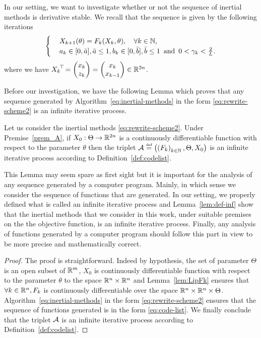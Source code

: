 In our setting, we want to investigate whether or not the sequence of inertial methods is derivative stable.   We recall that the sequence is given by the following iterations 
\begin{equation}\label{eq:rewrite-scheme2}
\begin{cases}
& X_{k+1}(\theta)=F_k(X_k,\theta),\quad \forall k\in\mathbb{N},\\
& a_{k}\in[0,\bar{a}], \bar{a}\leq1, b_{k}\in[0,\bar{b}], \bar{b}\leq1\enskip \text{and} \enskip 0<\gamma_{k}<\frac{2}{L}.
\end{cases}
\end{equation}
where we have ${X_k}^{\!\top\!}=\begin{pmatrix}x_{k}\\{z}_{k}\end{pmatrix}=\begin{pmatrix}x_{k}\\x_{k-1}\end{pmatrix}\in\mathbb{R}^{2n}$. 

Before our investigation, we have the following Lemma which proves that any sequence generated by Algorithm~\ref{eq:inertial-methods} in the form \eqref{eq:rewrite-scheme2} is an infinite iterative process.
\begin{lemma}\label{lem:def-inf} Let us consider the  inertial methods \eqref{eq:rewrite-scheme2}. Under Premise~\ref{prem_A}, if $X_0:\Theta\to\mathbb{R}^{2n}$ is a continuously differentiable function with respect to the parameter $\theta$ then the triplet $\mathcal{A}\stackrel{\text{\rm\tiny def}}{=}\left({\left(F_k\right)_{k\in\mathbb{N}},\Theta,X_0}\right)$ is an infinite  iterative process according to Definition~\ref{def:codelist}.
\end{lemma}
\begin{remark}\label{rmk:def-inf} This Lemma may seem spare as first sight but it is important for the analysis of any sequence  generated by a computer program. Mainly, in which sense we consider the sequence of functions that are generated. In our setting, we properly defined what is called an infinite iterative process and Lemma~\ref{lem:def-inf} show that  the inertial methods that we consider in this work, under suitable premises on the the objective function, is an infinite iterative process. Finally, any analysis of functions generated by a computer program should follow this part in view to be  more precise and mathematically correct.
\end{remark}

\begin{proof}
The proof is straightforward. Indeed by hypothesis,  the set of parameter $\Theta$ is an open subset of $\mathbb{R}^m$, $X_0$ is continuously differentiable function  with respect to the parameter $\theta$ to the space $\mathbb{R}^n\times\mathbb{R}^n$ and Lemma~\ref{lem:LipFk} ensures that $\forall k\in\mathbb{R}^n, F_k$ is continuously differentiable over the space $\mathbb{R}^n\times\mathbb{R}^n\times\Theta$.  Algorithm~\ref{eq:inertial-methods} in the form \eqref{eq:rewrite-scheme2} ensures that the sequence of functions generated is in the form \eqref{eq:code-list}. We finally conclude  that  the triplet $\mathcal{A}$ is an infinite  iterative process according to Definition~\ref{def:codelist}.
\end{proof}

